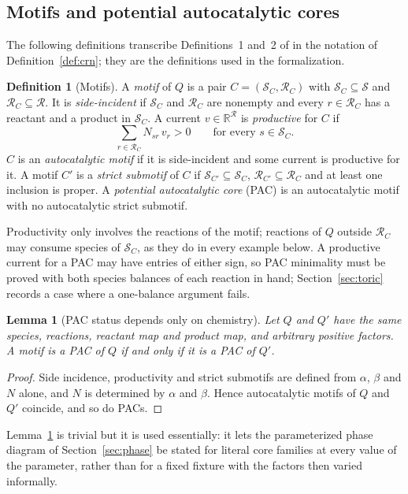 \documentclass[11pt,a4paper]{article}
\theoremstyle{plain}
\newtheorem{lemma}[theorem]{Lemma}
\theoremstyle{definition}
\newtheorem{definition}[theorem]{Definition}
\theoremstyle{remark}
\newcommand{\R}{\mathbb{R}}
\newcommand{\cS}{\mathcal{S}}
\newcommand{\cR}{\mathcal{R}}
\begin{document}
\subsection{Motifs and potential autocatalytic cores}

The following definitions transcribe Definitions~1 and~2 of \citep{kosc2025} in the notation of Definition~\ref{def:crn}; they are the definitions used in the formalization.

\begin{definition}[Motifs]\label{def:motif}
A \emph{motif} of $Q$ is a pair $C=(\cS_C,\cR_C)$ with $\cS_C\subseteq\cS$ and $\cR_C\subseteq\cR$. It is \emph{side-incident} if $\cS_C$ and $\cR_C$ are nonempty and every $r\in\cR_C$ has a reactant and a product in $\cS_C$. A current $v\in\R^{\cR}$ is \emph{productive} for $C$ if
\[
  \sum_{r\in\cR_C}N_{sr}\,v_r>0\qquad\text{for every }s\in\cS_C .
\]
$C$ is an \emph{autocatalytic motif} if it is side-incident and some current is productive for it. A motif $C'$ is a \emph{strict submotif} of $C$ if $\cS_{C'}\subseteq\cS_C$, $\cR_{C'}\subseteq\cR_C$ and at least one inclusion is proper. A \emph{potential autocatalytic core} (PAC) is an autocatalytic motif with no autocatalytic strict submotif.
\end{definition}

Productivity only involves the reactions of the motif; reactions of $Q$ outside $\cR_C$ may consume species of $\cS_C$, as they do in every example below. A productive current for a PAC may have entries of either sign, so PAC minimality must be proved with both species balances of each reaction in hand; Section~\ref{sec:toric} records a case where a one-balance argument fails.

\begin{lemma}[PAC status depends only on chemistry]\label{lem:rebase}
Let $Q$ and $Q'$ have the same species, reactions, reactant map and product map, and arbitrary positive factors. A motif is a PAC of $Q$ if and only if it is a PAC of $Q'$.
\end{lemma}

\begin{proof}
Side incidence, productivity and strict submotifs are defined from $\alpha$, $\beta$ and $N$ alone, and $N$ is determined by $\alpha$ and $\beta$. Hence autocatalytic motifs of $Q$ and $Q'$ coincide, and so do PACs.
\end{proof}

Lemma~\ref{lem:rebase} is trivial but it is used essentially: it lets the parameterized phase diagram of Section~\ref{sec:phase} be stated for literal core families at every value of the parameter, rather than for a fixed fixture with the factors then varied informally.
\end{document}

